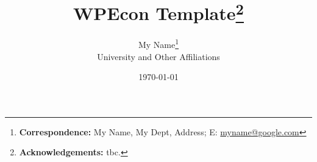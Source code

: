\documentclass[12pt,letterpaper]{article}
\title{WPEcon Template\thanks{\textbf{Acknowledgements:} tbc. }}
\author{My Name\thanks{\textbf{Correspondence:} My Name, My Dept, Address; E: \href{mailto:myname@google.com}{myname@google.com}} \\ \small University and Other Affiliations}
\date{\small \monthyeardate \today}
\begin{document}
\maketitle

\begin{abstract}
	\lipsum[1]
\end{abstract}







\newpage

{\small }

\newpage
\begin{appendix}

\end{appendix}
\end{document}
